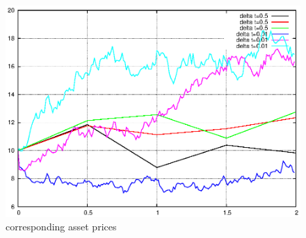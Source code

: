\documentclass[]{article}
\begin{document}
\begin{figure}[!ht]
\centering
\includegraphics{task10_s}
\caption{corresponding asset prices}
\label{fig:Task10b}
\end{figure}
\clearpage
\end{document}
